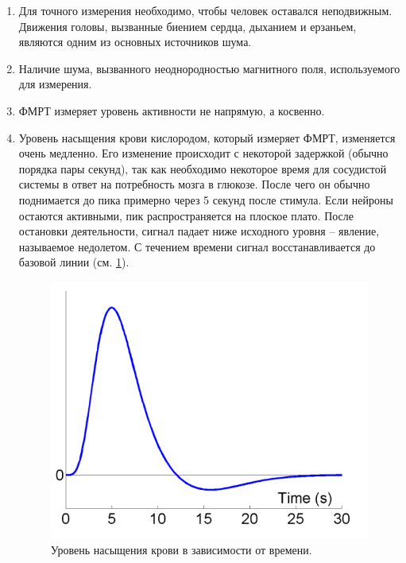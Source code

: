 \documentclass[pdftex,ptm,12pt,a4paper]{report}
\theoremstyle{definition}
\begin{document}
\begin{enumerate}
\item Для точного измерения необходимо, чтобы человек оставался неподвижным. Движения головы, вызванные биением сердца, дыханием и  ерзаньем, являются одним из основных источников шума.

\item Наличие шума, вызванного неоднородностью магнитного поля, используемого для измерения.

\item ФМРТ измеряет уровень активности не напрямую, а косвенно.

\item Уровень насыщения крови кислородом, который измеряет ФМРТ, изменяется очень медленно. Его изменение происходит с некоторой задержкой (обычно порядка пары секунд), так как необходимо некоторое время для сосудистой системы в ответ на потребность мозга в глюкозе. После чего он обычно поднимается до пика примерно через 5 секунд после стимула. Если нейроны остаются активными, пик распространяется на плоское плато. После остановки деятельности, сигнал падает ниже исходного уровня -- явление, называемое недолетом. С течением времени сигнал восстанавливается до базовой линии (см. \ref{hrf}). 

\begin{figure}[h]
\includegraphics[scale=0.4]{images/hrf.png}
\centering
\caption{Уровень насыщения крови в зависимости от времени.}
\label{hrf}
\end{figure}

\end{enumerate}
\end{document}
